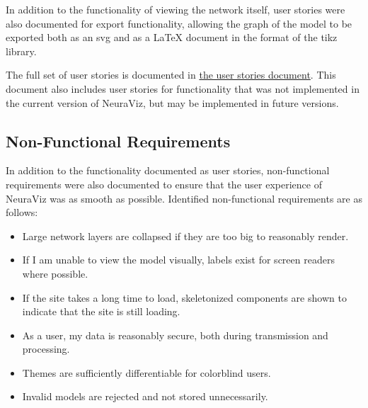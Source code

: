 In addition to the functionality of viewing the network itself, user stories were also documented for export functionality, allowing the graph of the model to be exported both as an svg and as a \LaTeX{} document in the format of the tikz library. 

The full set of user stories is documented in \href{https://github.com/Bennett-Wendorf/NeuraViz/blob/main/docs/user_stories.md}{the user stories document}. This document also includes user stories for functionality that was not implemented in the current version of NeuraViz, but may be implemented in future versions.


\subsection{Non-Functional Requirements}
In addition to the functionality documented as user stories, non-functional requirements were also documented to ensure that the user experience of NeuraViz was as smooth as possible. Identified non-functional requirements are as follows:
\begin{itemize}
    \item Large network layers are collapsed if they are too big to reasonably render.
    \item If I am unable to view the model visually, labels exist for screen readers where possible.
    \item If the site takes a long time to load, skeletonized components are shown to indicate that the site is still loading.
    \item As a user, my data is reasonably secure, both during transmission and processing.
    \item Themes are sufficiently differentiable for colorblind users.
    \item Invalid models are rejected and not stored unnecessarily.
\end{itemize}
